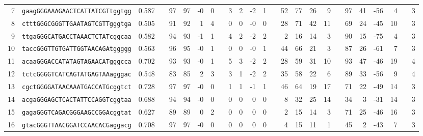 \begin{tabular}{rlrcrrrrcrrrrcrrrrcrrrrcr}
7 &
 \texttt{gaagGGGAAAGAACTCATTATCGTtggtgg} &
 0.587 &
 &
 97 &
  97 &
  -0 &
  0 &
  &
 3 &
  2 &
  -2 &
  1 &
  &
 52 &
  77 &
  26 &
  9 &
  &
 97 &
  41 &
  -56 &
  4 &
  &
 3 \\

8 &
 \texttt{ctttGGGCGGGTTGAATAGTCGTTgggtga} &
 0.505 &
 &
 91 &
  92 &
  1 &
  4 &
  &
 0 &
  0 &
  -0 &
  0 &
  &
 28 &
  71 &
  42 &
  11 &
  &
 69 &
  24 &
  -45 &
  10 &
  &
 3 \\

9 &
 \texttt{ttgaGGGCATGACCTAAACTCTATcggcaa} &
 0.582 &
 &
 94 &
  93 &
  -1 &
  1 &
  &
 4 &
  2 &
  -2 &
  2 &
  &
 2 &
  16 &
  14 &
  3 &
  &
 90 &
  15 &
  -75 &
  4 &
  &
 3 \\

10 &
 \texttt{taccGGGTTGTGATTGGTAACAGAtggggg} &
 0.563 &
 &
 96 &
  95 &
  -0 &
  1 &
  &
 0 &
  0 &
  -0 &
  1 &
  &
 44 &
  66 &
  21 &
  3 &
  &
 87 &
  26 &
  -61 &
  7 &
  &
 3 \\

11 &
 \texttt{acaaGGGACCATATAGTAGAACATgggcca} &
 0.702 &
 &
 93 &
  93 &
  -0 &
  1 &
  &
 5 &
  3 &
  -2 &
  2 &
  &
 28 &
  59 &
  31 &
  10 &
  &
 93 &
  47 &
  -46 &
  19 &
  &
 4 \\

12 &
 \texttt{tctcGGGGTCATCAGTATGAGTAAagggac} &
 0.548 &
 &
 83 &
  85 &
  2 &
  3 &
  &
 3 &
  1 &
  -2 &
  2 &
  &
 35 &
  58 &
  22 &
  6 &
  &
 89 &
  33 &
  -56 &
  9 &
  &
 4 \\

13 &
 \texttt{cgctGGGGATAACAAATGACCATGcggtct} &
 0.728 &
 &
 97 &
  97 &
  -0 &
  0 &
  &
 1 &
  1 &
  -1 &
  1 &
  &
 46 &
  64 &
  19 &
  17 &
  &
 71 &
  22 &
  -49 &
  14 &
  &
 3 \\

14 &
 \texttt{acgaGGGAGCTCACTATTCCAGGTcggtaa} &
 0.688 &
 &
 94 &
  94 &
  -0 &
  0 &
  &
 0 &
  0 &
  0 &
  0 &
  &
 8 &
  32 &
  25 &
  14 &
  &
 34 &
  3 &
  -31 &
  14 &
  &
 3 \\

15 &
 \texttt{gagaGGGTCAGACGGGAAGCCGGAcggtat} &
 0.627 &
 &
 89 &
  89 &
  0 &
  2 &
  &
 0 &
  0 &
  0 &
  0 &
  &
 2 &
  15 &
  14 &
  3 &
  &
 71 &
  25 &
  -46 &
  16 &
  &
 3 \\

16 &
 \texttt{gtacGGGTTAACGGATCCAACACGaggacg} &
 0.708 &
 &
 97 &
  97 &
  -0 &
  0 &
  &
 0 &
  0 &
  0 &
  0 &
  &
 4 &
  15 &
  11 &
  1 &
  &
 45 &
  2 &
  -43 &
  7 &
  &
 3 \\


\end{tabular}
